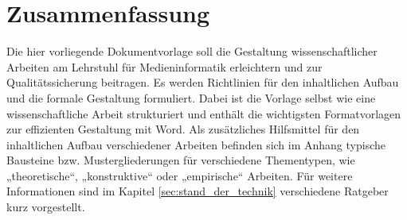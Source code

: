 \section{Zusammenfassung}\label{sec:zusammenfassung}

Die hier vorliegende Dokumentvorlage soll die Gestaltung wissenschaftlicher Arbeiten am Lehrstuhl für Medieninformatik erleichtern und zur Qualitätssicherung beitragen. Es werden Richtlinien für den inhaltlichen Aufbau und die formale Gestaltung formuliert. Dabei ist die Vorlage selbst wie eine wissenschaftliche Arbeit strukturiert und enthält die wichtigsten Formatvorlagen zur effizienten Gestaltung mit Word. Als zusätzliches Hilfsmittel für den inhaltlichen Aufbau verschiedener Arbeiten befinden sich im Anhang typische Bausteine bzw. Mustergliederungen für verschiedene Thementypen, wie „theoretische“, „konstruktive“ oder „empirische“ Arbeiten. Für weitere Informationen sind im Kapitel \ref{sec:stand_der_technik} verschiedene Ratgeber kurz vorgestellt. 
